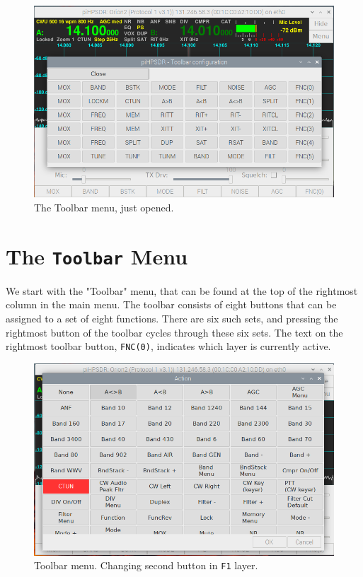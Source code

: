 \documentclass[12pt]{book}
\def\rett#1{\texttt{\color{red}#1}}
\begin{document}
\begin{figure}[ht]
\center
\includegraphics[width=12cm]{ToolbarMenu1.png}
\caption{The Toolbar menu, just opened.}
\label{fig:ToolbarMenu1}
\end{figure}

\section{The \texttt{Toolbar} Menu}
\label{sec:toolbarmenu}
We start with the "Toolbar" menu, that can be found at the top of the rightmost
column in the main menu. The toolbar consists of eight buttons that can be assigned
to a set of eight functions. There are six such sets, and pressing the rightmost button
of the toolbar cycles through these six sets. The text on the rightmost toolbar button, \rett{FNC(0)}, indicates which
layer is currently active. 

\begin{figure}[ht!]
\center
\includegraphics[width=12cm]{ToolbarMenu2.png}
\caption{Toolbar menu. Changing second button in \texttt{F1} layer.}
\label{fig:ToolbarMenu2}
\end{figure}
\end{document}
